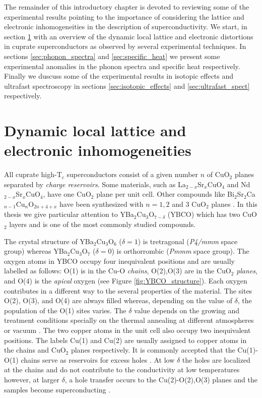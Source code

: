 The remainder of this introductory chapter is devoted to reviewing some of the experimental results pointing to the importance of considering the lattice and electronic inhomogeneities in the description of superconductivity. 
We start, in section \ref{sec:dynamicDistortions} with an overview of the dynamic local lattice and electronic distortions in cuprate superconductors as observed by several experimental techniques. 
In sections \ref{sec:phonon_spectra} and \ref{sec:specific_heat} we present some experimental anomalies in the phonon spectra and specific heat respectively.
Finally we duscuss some of the experimental results in isotopic effects and ultrafast spectroscopy in sections \ref{sec:isotopic_effects} and \ref{sec:ultrafast_spect} respectively.


\section{Dynamic local lattice and electronic inhomogeneities}
\label{sec:dynamicDistortions}

All cuprate high-T$_c$ superconductors consist of a given number $n$ of CuO$_2$ planes separated by \textit{charge reservoirs}.
Some materials, such as La$_{2-x}$Sr$_x$CuO$_4$ and Nd$_{2-x}$Sr$_x$CuO$_4$, have one CuO$_2$ plane per unit cell. 
Other compounds like Bi$_2$Sr$_2$Ca$_{n-1}$Cu$_n$O$_{2n+4+x}$ have been synthesized with $n=1,2$ and 3 CuO$_2$ planes \cite{Basov2005}.
In this thesis we give particular attention to YBa$_2$Cu$_3$O$_{7-\delta}$ (YBCO) which has two CuO$_2$ layers and is one of the most commonly studied compounds.

The crystal structure of YBa$_2$Cu$_3$O$_6$ ($\delta=1$) is tretragonal (\textit{P4/mmm} space group) whereas YBa$_2$Cu$_3$O$_7$ ($\delta=0$) is orthorrombic (\textit{Pmmm} space group).
The oxygen atoms in YBCO occupy four inequivalent positions and are usually labelled as follows: O(1) is in the Cu-O \textit{chains}, O(2),O(3) are in the CuO$_2$ \textit{planes}, and O(4) is the \textit{apical} oxygen (see Figure \ref{fig:YBCO_structure}).
Each oxygen contributes in a different way to the several properties of the material.
The sites O(2), O(3), and O(4) are always filled whereas, depending on the value of $\delta$, the population of the O(1) sites varies.
The $\delta$ value depends on the growing and treatment conditions specially on the thermal annealing at different atmospheres or vacuum \cite{Ivanov1995}.
The two copper atoms in the unit cell also occupy two inequivalent positions.
The labels Cu(1) and Cu(2) are usually assigned to copper atoms in the chains and CuO$_2$ planes respectively.
It is commonly accepted that the Cu(1)-O(1) chains serve as reservoirs for excess holes \cite{Pickett1989}. 
At low $\delta$ the holes are localized at the chains and do not contribute to the conductivity at low temperatures however, at larger $\delta$, a hole transfer occurs to the Cu(2)-O(2),O(3) planes and the samples become superconducting \cite{Cava1988}.

